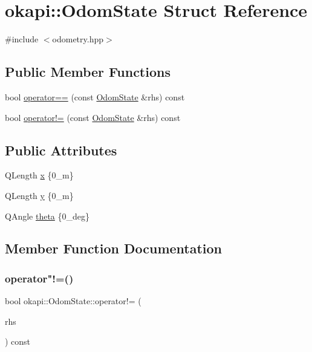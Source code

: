 \hypertarget{structokapi_1_1OdomState}{}\section{okapi\+::Odom\+State Struct Reference}
\label{structokapi_1_1OdomState}


{\ttfamily \#include $<$odometry.\+hpp$>$}

\subsection*{Public Member Functions}
\begin{DoxyCompactItemize}
\item 
bool \mbox{\hyperlink{structokapi_1_1OdomState_a17668afbbe39bcc745233a679aa917de}{operator==}} (const \mbox{\hyperlink{structokapi_1_1OdomState}{Odom\+State}} \&rhs) const
\item 
bool \mbox{\hyperlink{structokapi_1_1OdomState_a961501c808d8818e959ba111baf7f359}{operator!=}} (const \mbox{\hyperlink{structokapi_1_1OdomState}{Odom\+State}} \&rhs) const
\end{DoxyCompactItemize}
\subsection*{Public Attributes}
\begin{DoxyCompactItemize}
\item 
Q\+Length \mbox{\hyperlink{structokapi_1_1OdomState_a53fbbb483d5073e703517745d769eb45}{x}} \{0\+\_\+m\}
\item 
Q\+Length \mbox{\hyperlink{structokapi_1_1OdomState_afcb08739959ad3afb7941a0bd59bcbb6}{y}} \{0\+\_\+m\}
\item 
Q\+Angle \mbox{\hyperlink{structokapi_1_1OdomState_a7d9c4f949e7ce0dd000c08318e61b921}{theta}} \{0\+\_\+deg\}
\end{DoxyCompactItemize}


\subsection{Member Function Documentation}
\mbox{\label{structokapi_1_1OdomState_a961501c808d8818e959ba111baf7f359}} 
\subsubsection{\texorpdfstring{operator"!=()}{operator!=()}}
{\footnotesize\ttfamily bool okapi\+::\+Odom\+State\+::operator!= (\begin{DoxyParamCaption}\item[{const \mbox{\hyperlink{structokapi_1_1OdomState}{Odom\+State}} \&}]{rhs }\end{DoxyParamCaption}) const}

